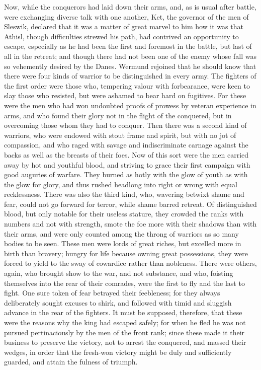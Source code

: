 \documentclass[10pt,a4paper]{report}
\begin{document}
Now, while the conquerors had laid down their arms, and, as is usual after battle, were exchanging diverse talk with one another, Ket, the governor of the men of Sleswik, declared that it was a matter of great marvel to him how it was that Athisl, though difficulties strewed his path, had contrived an opportunity to escape, especially as he had been the first and foremost in the battle, but last of all in the retreat; and though there had not been one of the enemy whose fall was so vehemently desired by the Danes. Wermund rejoined that he should know that there were four kinds of warrior to be distinguished in every army. The fighters of the first order were those who, tempering valour with forbearance, were keen to slay those who resisted, but were ashamed to bear hard on fugitives. For these were the men who had won undoubted proofs of prowess by veteran experience in arms, and who found their glory not in the flight of the conquered, but in overcoming those whom they had to conquer. Then there was a second kind of warriors, who were endowed with stout frame and spirit, but with no jot of compassion, and who raged with savage and indiscriminate carnage against the backs as well as the breasts of their foes. Now of this sort were the men carried away by hot and youthful blood, and striving to grace their first campaign with good auguries of warfare. They burned as hotly with the glow of youth as with the glow for glory, and thus rushed headlong into right or wrong with equal recklessness. There was also the third kind, who, wavering betwixt shame and fear, could not go forward for terror, while shame barred retreat. Of distinguished blood, but only notable for their useless stature, they crowded the ranks with numbers and not with strength, smote the foe more with their shadows than with their arms, and were only counted among the throng of warriors as so many bodies to be seen. These men were lords of great riches, but excelled more in birth than bravery; hungry for life because owning great possessions, they were forced to yield to the sway of cowardice rather than nobleness. There were others, again, who brought show to the war, and not substance, and who, foisting themselves into the rear of their comrades, were the first to fly and the last to fight. One sure token of fear betrayed their feebleness; for they always deliberately sought excuses to shirk, and followed with timid and sluggish advance in the rear of the fighters. It must be supposed, therefore, that these were the reasons why the king had escaped safely; for when he fled he was not pursued pertinaciously by the men of the front rank; since these made it their business to preserve the victory, not to arrest the conquered, and massed their wedges, in order that the fresh-won victory might be duly and sufficiently guarded, and attain the fulness of triumph.\\
\end{document}
